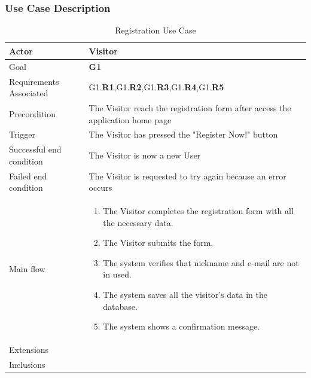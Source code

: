 \subsubsection{Use Case Description}
\newline
\begin{table}[htb]
\begin{center}
\renewcommand{\arraystretch}{1.5}
\begin{tabular}{|l|p{}|}
\hline
Actor & Visitor \\ \hline
Goal & \textbf{G1} \\ \hline
Requirements Associated & G1.\textbf{R1},G1.\textbf{R2},G1.\textbf{R3},G1.\textbf{R4},G1.\textbf{R5} \\ \hline
Precondition & The Visitor reach the registration form after access the application home page \\ \hline
Trigger & The Visitor has pressed the "Register Now!" button \\ \hline
Successful end condition & The Visitor is now a new User \\ \hline
Failed end condition & The Visitor is requested to try again because an error occurs \\ \hline
Main flow & \begin{minipage}[t]{0.6\textwidth}
\begin{enumerate}
\addtolength{\itemindent}{0.5cm}
\item The Visitor completes the registration form with all the necessary data.
\item The Visitor submits the form.
\item The system verifies that nickname and e-mail are not in used.
\item The system saves all the visitor's data in the database.
\item The system shows a confirmation message.
\vspace{1,5mm}
\end{enumerate}
\end{minipage} \\ \hline
Extensions & \\ \hline
Inclusions & \\ \hline
\end{tabular}
\caption{Registration Use Case}
\end{center}
\end{table}
\clearpage

